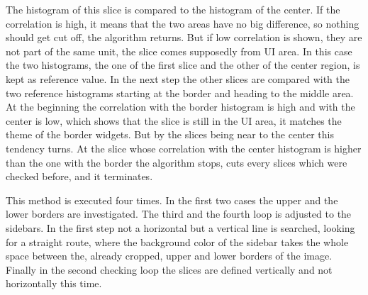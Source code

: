 \documentclass[draft,final]{vutinfth} %
\begin{document}
The histogram of this slice is compared to the histogram of the center.
If the correlation is high, it means that the two areas have no big difference, so nothing should get cut off, the algorithm returns.
But if low correlation is shown, they are not part of the same unit, the slice comes supposedly from UI area.
In this case the two histograms, the one of the first slice and the other of the center region, is kept as reference value.
In the next step the other slices are compared with the two reference histograms starting at the border and heading to the middle area.
At the beginning the correlation with the border histogram is high and with the center is low, which shows that the slice is still in the UI area, it matches the theme of the border widgets.
But by the slices being near to the center this tendency turns.
At the slice whose correlation with the center histogram is higher than the one with the border the algorithm stops, cuts every slices which were checked before, and it terminates.\par 
This method is executed four times.
In the first two cases the upper and the lower borders are investigated.
The third and the fourth loop is adjusted to the sidebars.
In the first step not a horizontal but a vertical line is searched, looking for a straight route, where the background color of the sidebar takes the whole space between the, already cropped, upper and lower borders of the image.
Finally in the second checking loop the slices are defined vertically and not horizontally this time. 
\end{document}
